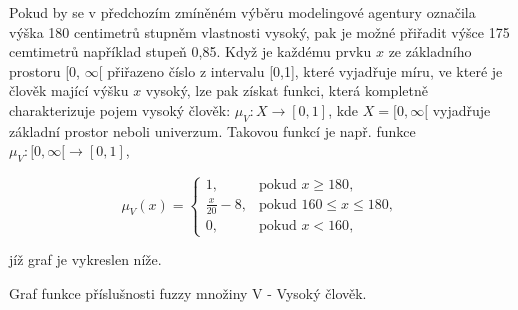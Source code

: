      Pokud by se v předchozím zmíněném výběru modelingové agentury označila výška 180 centimetr\r u stupněm vlastnosti \clqq vysoký\crqq {}, pak je možné přiřadit výšce 175 cemtimetr\r u například stupe\v n 0,85. Když je každému prvku $x$ ze základního prostoru [0, $\infty$[ přiřazeno číslo z intervalu [0,1], které vyjadřuje míru, ve které je člověk mající výšku $x$ vysoký, lze pak získat funkci, která kompletně charakterizuje pojem vysoký člověk: $\mu_V: X \rightarrow [0,1]$, kde $X = [0, \infty[$ vyjadřuje základní prostor neboli univerzum. Takovou funkcí je např. funkce $\mu_V:  [0, \infty[ \rightarrow [0,1]$, 

    $$\mu_V(x)=\begin{cases} 1, & \mbox{pokud }  x \geq 180,\\ 
    \frac{x}{20} - 8, & \mbox{pokud } 160 \leq x \leq 180,\\
    0, & \mbox{pokud } x < 160,  \end{cases}$$

    jíž graf je vykreslen níže.

    \begin{graph} Graf funkce příslušnosti fuzzy množiny V - \clqq Vysoký člověk\crqq.\\
    \end{graph}



